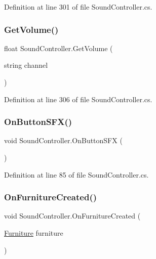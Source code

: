 Definition at line 301 of file Sound\+Controller.\+cs.

\mbox{\label{class_sound_controller_aeaf20fc1bf450d878339868631689441}} 
\subsubsection{\texorpdfstring{Get\+Volume()}{GetVolume()}\hspace{0.1cm}{\footnotesize\ttfamily [2/2]}}
{\footnotesize\ttfamily float Sound\+Controller.\+Get\+Volume (\begin{DoxyParamCaption}\item[{string}]{channel }\end{DoxyParamCaption})}



Definition at line 306 of file Sound\+Controller.\+cs.

\mbox{\label{class_sound_controller_a65991a17e33a3acd09126e63c432dbaa}} 
\subsubsection{\texorpdfstring{On\+Button\+S\+F\+X()}{OnButtonSFX()}}
{\footnotesize\ttfamily void Sound\+Controller.\+On\+Button\+S\+FX (\begin{DoxyParamCaption}{ }\end{DoxyParamCaption})}



Definition at line 85 of file Sound\+Controller.\+cs.

\mbox{\label{class_sound_controller_a0be0abc53e066a8cf60871eb95a861f9}} 
\subsubsection{\texorpdfstring{On\+Furniture\+Created()}{OnFurnitureCreated()}}
{\footnotesize\ttfamily void Sound\+Controller.\+On\+Furniture\+Created (\begin{DoxyParamCaption}\item[{\hyperlink{class_furniture}{Furniture}}]{furniture }\end{DoxyParamCaption})}



